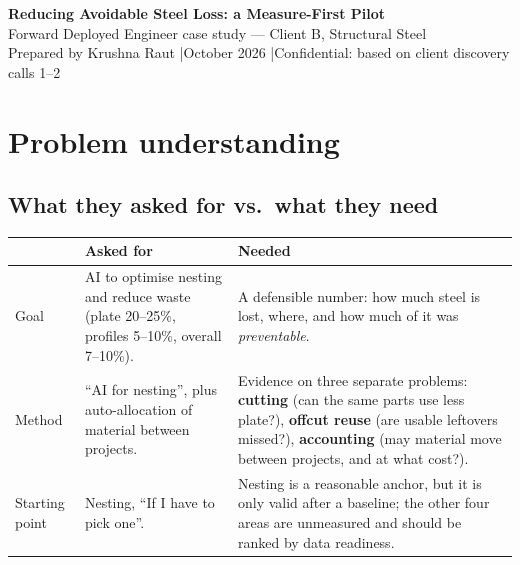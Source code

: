\documentclass[10pt,a4paper]{article}
\begin{document}
{\LARGE\bfseries Reducing Avoidable Steel Loss: a Measure-First Pilot}\\[2pt]
{\large Forward Deployed Engineer case study --- Client B, Structural Steel}\\[2pt]
\small Prepared by Krushna Raut \quad|\quad October 2026 \quad|\quad Confidential: based on client discovery calls 1--2

\vspace{4pt}
\noindent{}

\section{Problem understanding}
\subsection{What they asked for vs.\ what they need}
\begin{tabular}{@{}P{3.6cm}P{6.2cm}P{6.2cm}@{}}
\toprule
 & \textbf{Asked for} & \textbf{Needed} \\
\midrule
Goal & AI to optimise nesting and reduce waste (plate 20--25\%, profiles 5--10\%, overall 7--10\%). & A defensible number: how much steel is lost, where, and how much of it was \emph{preventable}. \\
Method & ``AI for nesting'', plus auto-allocation of material between projects. & Evidence on three separate problems: \textbf{cutting} (can the same parts use less plate?), \textbf{offcut reuse} (are usable leftovers missed?), \textbf{accounting} (may material move between projects, and at what cost?). \\
Starting point & Nesting, ``If I have to pick one''. & Nesting is a reasonable anchor, but it is only valid after a baseline; the other four areas are unmeasured and should be ranked by data readiness. \\
\bottomrule
\end{tabular}
\end{document}
